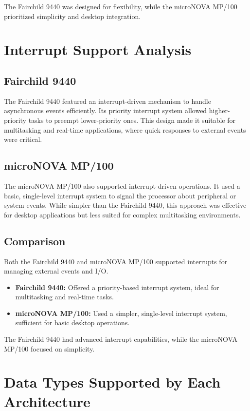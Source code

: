 \documentclass[a4paper,12pt]{article}
\begin{document}
The Fairchild 9440 was designed for flexibility, while the microNOVA MP/100 prioritized simplicity and desktop integration.

\section{Interrupt Support Analysis}

\subsection{Fairchild 9440}

The Fairchild 9440 featured an interrupt-driven mechanism to handle asynchronous events efficiently. Its priority interrupt system allowed higher-priority tasks to preempt lower-priority ones. This design made it suitable for multitasking and real-time applications, where quick responses to external events were critical.

\subsection{microNOVA MP/100}

The microNOVA MP/100 also supported interrupt-driven operations. It used a basic, single-level interrupt system to signal the processor about peripheral or system events. While simpler than the Fairchild 9440, this approach was effective for desktop applications but less suited for complex multitasking environments.

\subsection{Comparison}

Both the Fairchild 9440 and microNOVA MP/100 supported interrupts for managing external events and I/O.  
\begin{itemize}
    \item \textbf{Fairchild 9440:} Offered a priority-based interrupt system, ideal for multitasking and real-time tasks.
    \item \textbf{microNOVA MP/100:} Used a simpler, single-level interrupt system, sufficient for basic desktop operations.
\end{itemize}

The Fairchild 9440 had advanced interrupt capabilities, while the microNOVA MP/100 focused on simplicity.


\section{Data Types Supported by Each Architecture}
\end{document}
